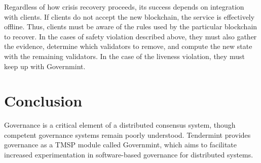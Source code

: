 Regardless of how crisis recovery proceeds, its success depends on integration with clients.
If clients do not accept the new blockchain, the service is effectively offline.
Thus, clients must be aware of the rules used by the particular blockchain to recover.
In the cases of safety violation described above, they must also gather the evidence,
determine which validators to remove, and compute the new state with the remaining validators.
In the case of the liveness violation, they must keep up with Governmint.

\section{Conclusion}

Governance is a critical element of a distributed consensus system, 
though competent governance systems remain poorly understood.
Tendermint provides governance as a TMSP module called Governmint,
which aims to facilitate increased experimentation in software-based governance for distributed systems.

